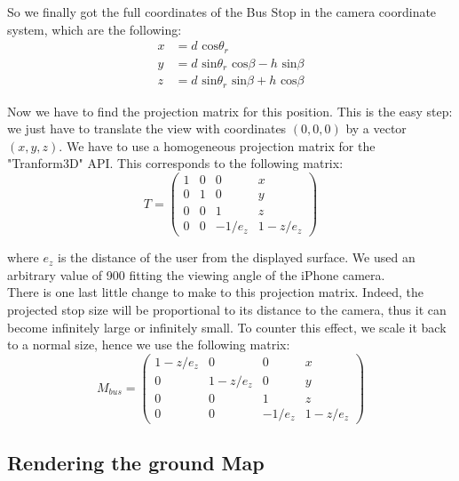 \clearpage
So we finally got the full coordinates of the Bus Stop in the camera coordinate system, which are the following:
\begin{align} 
x	&= 	 d\textrm{ cos}\theta_r\\
y 	&= 	d\textrm{ sin}\theta_r\textrm{ cos}\beta - h\textrm{ sin}\beta\\
z 	&= 	d\textrm{ sin}\theta_r\textrm{ sin}\beta + h\textrm{ cos}\beta
\end{align}


Now we have to find the projection matrix for this position. This is the easy step: we just have to translate the view with coordinates $(0, 0, 0)$ by a vector $(x, y, z)$. We have to use a homogeneous projection matrix for the "Tranform3D" API. This corresponds to the following matrix:
\begin{equation}
T = \left( \begin{array}{cccc}
	1					& 0 					& 0 						& x\\
	0 					& 1					& 0 						& y\\
	0					& 0					& 1						& z\\
	0					& 0					& -1/e_z					& 1-z / e_z
\end{array} \right)
\end{equation}

where $e_z$ is the distance of the user from the displayed surface. We used an arbitrary value of 900 fitting the viewing angle of the iPhone camera.\\

There is one last little change to make to this projection matrix. Indeed, the projected stop size will be proportional to its distance to the camera, thus it can become infinitely large or infinitely small. To counter this effect, we scale it back to a normal size, hence we use the following matrix:
\begin{equation}
M_{bus} = \left( \begin{array}{cccc}
	1-z / e_z				& 0 					& 0 						& x\\
	0 					& 1-z / e_z			& 0 						& y\\
	0					& 0					& 1						& z\\
	0					& 0					& -1/e_z					& 1-z / e_z
\end{array} \right)
\end{equation}

\subsection{Rendering the ground Map}

